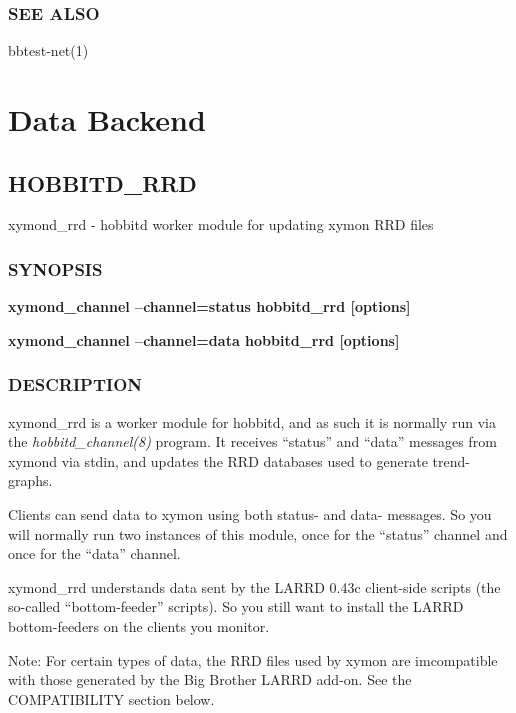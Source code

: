  
\subsection{SEE ALSO}
bbtest-net(1) 
  

%
\chapter{Data Backend}
\section{HOBBITD\_RRD}

 xymond\_rrd - hobbitd worker module for updating xymon RRD files

\subsection{SYNOPSIS}
\textbf{xymond\_channel --channel=status hobbitd\_rrd [options]}
 
\textbf{xymond\_channel --channel=data hobbitd\_rrd [options]}


 
\subsection{DESCRIPTION}
 xymond\_rrd is a worker module for hobbitd, and as such it is normally run via the \emph{hobbitd\_channel(8)}
 program. It receives ``status'' and ``data'' messages from xymond via stdin, and updates the RRD databases used to generate trend-graphs. 

  Clients can send data to xymon using both status- and data- messages. So you will normally run two instances of this module, once for the ``status'' channel and once for the ``data'' channel. 


  xymond\_rrd understands data sent by the LARRD 0.43c client-side scripts (the so-called ``bottom-feeder'' scripts). So you still want to install the LARRD bottom-feeders on the clients you monitor. 


  Note: For certain types of data, the RRD files used by xymon are imcompatible with those generated by the Big Brother LARRD add-on. See the COMPATIBILITY section below. 


 


